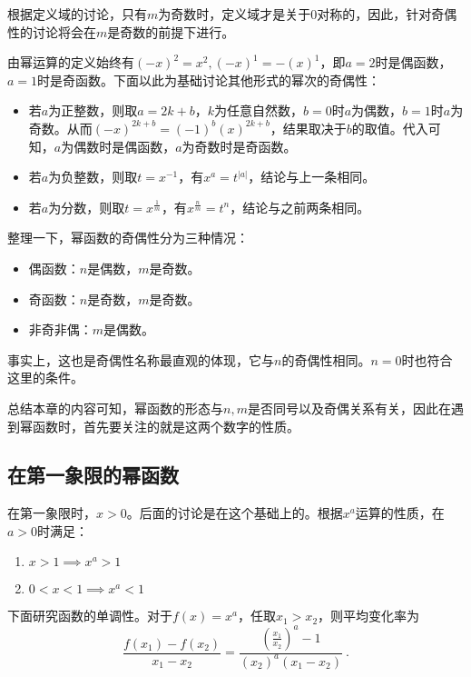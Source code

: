 根据定义域的讨论，只有$m$为奇数时，定义域才是关于$0$对称的，因此，针对奇偶性的讨论将会在$m$是奇数的前提下进行。

由幂运算的定义始终有$(-x)^2=x^2,(-x)^1=-(x)^1$，即$a=2$时是偶函数，$a=1$时是奇函数。下面以此为基础讨论其他形式的幂次的奇偶性：

\begin{itemize}
\item 若$a$为正整数，则取$a=2k+b$，$k$为任意自然数，$b=0$时$a$为偶数，$b=1$时$a$为奇数。从而$(-x)^{2k+b}=(-1)^b(x)^{2k+b}$，结果取决于$b$的取值。代入可知，$a$为偶数时是偶函数，$a$为奇数时是奇函数。
\item 若$a$为负整数，则取$t=x^{-1}$，有$x^a=t^{|a|}$，结论与上一条相同。
\item 若$a$为分数，则取$t=x^\frac{1}{m}$，有$x^\frac{n}{m}=t^{n}$，结论与之前两条相同。
\end{itemize}

整理一下，幂函数的奇偶性分为三种情况：

\begin{itemize}
\item 偶函数：$n$是偶数，$m$是奇数。
\item 奇函数：$n$是奇数，$m$是奇数。
\item 非奇非偶：$m$是偶数。
\end{itemize}

事实上，这也是奇偶性名称最直观的体现，它与$n$的奇偶性相同。$n=0$时也符合这里的条件。

总结本章的内容可知，幂函数的形态与$n,m$是否同号以及奇偶关系有关，因此在遇到幂函数时，首先要关注的就是这两个数字的性质。

\subsection{在第一象限的幂函数}

在第一象限时，$x>0$。后面的讨论是在这个基础上的。根据$x^a$运算的性质，在$a>0$时满足：
\begin{enumerate}
\item $x>1\implies x^a>1$
\item $0<x<1\implies x^a<1$
\end{enumerate}

下面研究函数的单调性。对于$f(x)=x^a$，任取$x_1>x_2$，则平均变化率为
\begin{equation}\label{eq_power_1}
\frac{f(x_1)-f(x_2)}{x_1-x_2}=\frac{\left(\frac{x_1}{x_2}\right)^a-1}{(x_2)^a(x_1-x_2)}~.
\end{equation}

